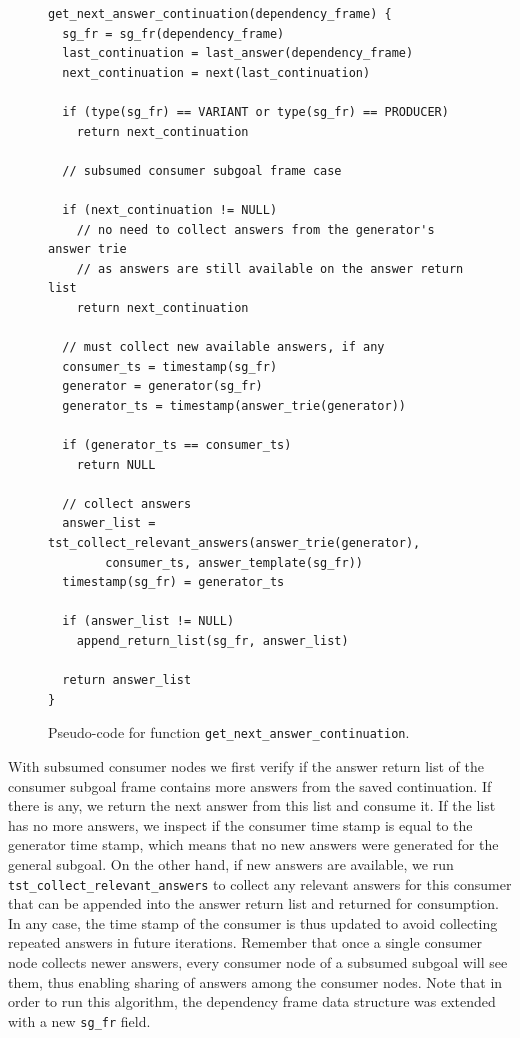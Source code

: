 \begin{figure}[ht]
\begin{Verbatim}
get_next_answer_continuation(dependency_frame) {
  sg_fr = sg_fr(dependency_frame)
  last_continuation = last_answer(dependency_frame)
  next_continuation = next(last_continuation)
  
  if (type(sg_fr) == VARIANT or type(sg_fr) == PRODUCER)
    return next_continuation
  
  // subsumed consumer subgoal frame case
  
  if (next_continuation != NULL)
    // no need to collect answers from the generator's answer trie
    // as answers are still available on the answer return list
    return next_continuation
  
  // must collect new available answers, if any
  consumer_ts = timestamp(sg_fr)
  generator = generator(sg_fr)
  generator_ts = timestamp(answer_trie(generator))
      
  if (generator_ts == consumer_ts)
    return NULL
        
  // collect answers
  answer_list = tst_collect_relevant_answers(answer_trie(generator),
        consumer_ts, answer_template(sg_fr))
  timestamp(sg_fr) = generator_ts
      
  if (answer_list != NULL)
    append_return_list(sg_fr, answer_list)
      
  return answer_list
}
\end{Verbatim}
\caption{Pseudo-code for function \texttt{get\_next\_answer\_continuation}.}
\label{fig:get_next_answer_continuation}
\end{figure}

With subsumed consumer nodes we first verify if the answer return list of the
consumer subgoal frame contains more answers from the saved continuation. If there is
any, we return the next answer from this list and consume it. If the list has no more answers,
we inspect if the consumer time stamp is equal to the generator time stamp, which means
that no new answers were generated for the general subgoal. On the other hand, if new
answers are available, we run \texttt{tst\_collect\_relevant\_answers} to collect any
relevant answers for this consumer that can be appended into the answer return list
and returned for consumption.
In any case, the time stamp of the consumer is thus updated to avoid collecting
repeated answers in future iterations. Remember that once a single consumer node
collects newer answers, every consumer node of a subsumed subgoal will see them, thus
enabling sharing of answers among the consumer nodes.
Note that in order to run this algorithm, the dependency frame data structure was extended
with a new \texttt{sg\_fr} field.

